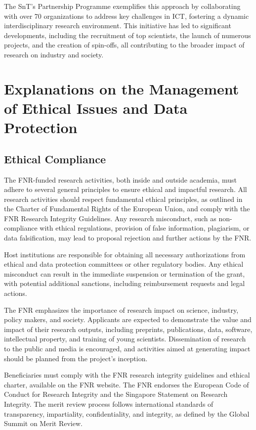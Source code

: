 \documentclass{article}
\begin{document}
The SnT’s Partnership Programme exemplifies this approach by collaborating with over 70 organizations to address key challenges in ICT, fostering a dynamic interdisciplinary research environment. This initiative has led to significant developments, including the recruitment of top scientists, the launch of numerous projects, and the creation of spin-offs, all contributing to the broader impact of research on industry and society.

\section{Explanations on the Management of Ethical Issues and Data Protection}

\subsection{Ethical Compliance}

The FNR-funded research activities, both inside and outside academia, must adhere to several general principles to ensure ethical and impactful research. All research activities should respect fundamental ethical principles, as outlined in the Charter of Fundamental Rights of the European Union, and comply with the FNR Research Integrity Guidelines. Any research misconduct, such as non-compliance with ethical regulations, provision of false information, plagiarism, or data falsification, may lead to proposal rejection and further actions by the FNR.

Host institutions are responsible for obtaining all necessary authorizations from ethical and data protection committees or other regulatory bodies. Any ethical misconduct can result in the immediate suspension or termination of the grant, with potential additional sanctions, including reimbursement requests and legal actions.

The FNR emphasizes the importance of research impact on science, industry, policy makers, and society. Applicants are expected to demonstrate the value and impact of their research outputs, including preprints, publications, data, software, intellectual property, and training of young scientists. Dissemination of research to the public and media is encouraged, and activities aimed at generating impact should be planned from the project's inception.

Beneficiaries must comply with the FNR research integrity guidelines and ethical charter, available on the FNR website. The FNR endorses the European Code of Conduct for Research Integrity and the Singapore Statement on Research Integrity. The merit review process follows international standards of transparency, impartiality, confidentiality, and integrity, as defined by the Global Summit on Merit Review.
\end{document}
